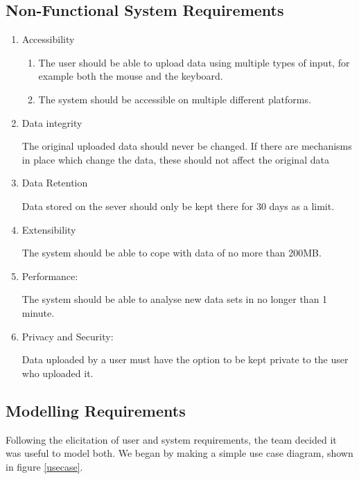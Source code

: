 \documentclass[titlepage]{article}
\begin{document}
\subsection{Non-Functional System Requirements}
\begin{enumerate}
  \item Accessibility
  \begin{enumerate}
    \item The user should be able to upload data using multiple types of input, for example both the mouse and the keyboard.
    \item The system should be accessible on multiple different platforms.
  \end{enumerate}

  \item Data integrity
  
  The original uploaded data should never be changed. If there are mechanisms in place which change the data, these should not affect the original data

 \item Data Retention
  
  Data stored on the sever should only be kept there for 30 days as a limit.

  \item Extensibility

  The system should be able to cope with data of no more than 200MB.

 \item Performance:

  The system should be able to analyse new data sets in no longer than 1 minute.

  \item Privacy and Security:

  Data uploaded by a user must have the option to be kept private to the user who uploaded it.
\end{enumerate}

\subsection{Modelling Requirements}
Following the elicitation of user and system requirements, the team decided it was useful to model both. We began by making a simple use case diagram, shown in figure \ref{usecase}.
\end{document}
